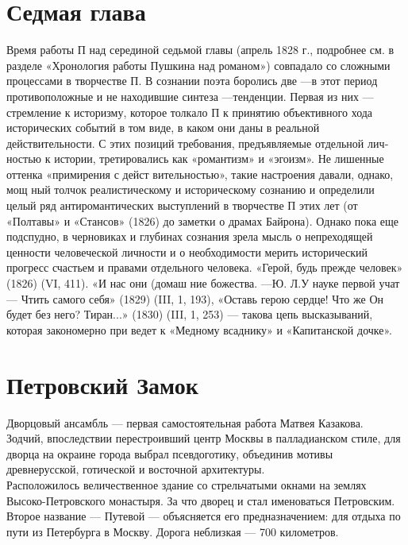\chapter{Седмая глава}  
Время работы П над серединой седьмой главы (апрель 1828 г., подробнее см. в разделе «Хро­нология работы Пушкина над романом») совпадало со сложными процессами в творчестве П. В сознании поэта боролись две —в этот период противоположные и не находившие синтеза —тенденции. Первая из них — стремление к историзму, которое толкало П к принятию объективного хода исторических событий в том виде, в каком они даны в реальной действительности. 
С этих позиций требования, предъявляемые отдельной лич­
ностью к истории, третировались как «романтизм» и
«эгоизм». Не лишенные оттенка «примирения с дейст­
вительностью», такие настроения давали, однако, мощ­
ный толчок реалистическому и историческому сознанию и
определили целый ряд антиромантических выступлений
в творчестве П этих лет (от «Полтавы» и «Стансов»
(1826) до заметки о драмах Байрона). Однако пока еще
подспудно, в черновиках и глубинах сознания зрела
мысль о непреходящей ценности человеческой личности
и о необходимости мерить исторический прогресс
счастьем и правами отдельного человека. «Герой, будь
прежде человек» (1826) (VI, 411). «И нас они (домаш­
ние божества. —Ю. Л.У науке первой учат — Чтить
самого себя» (1829) (III, 1, 193), «Оставь герою сердце!
Что же Он будет без него? Тиран...» (1830) (III, 1, 253) —
такова цепь высказываний, которая закономерно при­
ведет к «Медному всаднику» и «Капитанской дочке».
\chapter{Петровский Замок}\label{ch:дд}
Дворцовый ансамбль — первая самостоятельная работа Матвея Казакова.\\
Зодчий, впоследствии перестроивший центр Москвы в палладианском стиле,
для дворца на окраине города выбрал псевдоготику, объединив мотивы древнерусской,
готической и восточной архитектуры.\\
 Расположилось величественное здание со стрельчатыми окнами на землях Высоко-Петровского монастыря. За что дворец и стал именоваться Петровским. Второе название — Путевой — объясняется его предназначением: для отдыха по пути из Петербурга в Москву. Дорога неблизкая — 700 километров.
 
